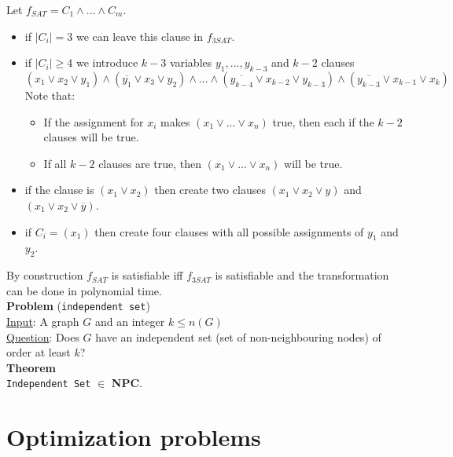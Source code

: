 \documentclass[a4paper, 12pt]{article}
\begin{document}
	Let $f_{SAT} = C_1 \land ... \land C_m$. \begin{itemize}
		\item if $\left|C_i\right| = 3$ we can leave this clause in $f_{3SAT}$.
		\item if $\left|C_i\right| \geq 4$ we introduce $k-3$ variables $y_1,...,y_{k-3}$ and $k-2$ clauses \[(x_1 \lor x_2 \lor y_1) \land (\overline{y_1} \lor x_3 \lor y_2) \land ... \land (\overline{y_{k-4}} \lor x_{k-2} \lor y_{k-3}) \land (\overline{y_{k-3}} \lor x_{k-1} \lor x_k)\]
		Note that: \begin{itemize}
			\item{} If the assignment for $x_i$ makes $(x_1 \lor ... \lor x_n)$ true, then each if the $k-2$ clauses will be true.
			\item If all $k-2$ clauses are true, then $(x_1 \lor ... \lor x_n)$ will be true.
		\end{itemize} 
	\item if the clause is $(x_1\lor x_2)$ then create two clauses $(x_1 \lor x_2 \lor y)$ and $(x_1 \lor x_2 \lor \overline{y})$.
	\item if $C_i = (x_1)$ then create four clauses with all possible assignments of $y_1$ and $y_2$.
	\end{itemize}
	By construction $f_{SAT}$ is satisfiable iff $f_{3SAT}$ is satisfiable and the transformation can be done in polynomial time.\\
	\textbf{Problem} (\texttt{independent set})\\
	\underline{Input}: A graph $G$ and an integer $k \leq n(G)$\\
	\underline{Question}: Does $G$ have an independent set (set of non-neighbouring nodes) of order at least $k$?\\
	\textbf{Theorem}\\
	\texttt{Independent Set} $\in$ \textbf{NPC}.

	\section{Optimization problems}
\end{document}

